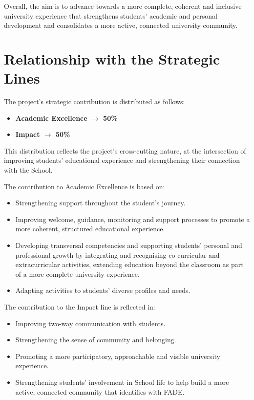 \documentclass[11pt,a4paper]{scrreprt}
\begin{document}
Overall, the aim is to advance towards a more complete, coherent and inclusive university experience that strengthens students' academic and personal development and consolidates a more active, connected university community.

\section{Relationship with the Strategic Lines}

\small
The project's strategic contribution is distributed as follows:

\begin{itemize}[noitemsep,topsep=2pt]
\item \textbf{Academic Excellence $\rightarrow$ 50\%}
\item \textbf{Impact $\rightarrow$ 50\%}
\end{itemize}
This distribution reflects the project's cross-cutting nature, at the intersection of improving students' educational experience and strengthening their connection with the School.

The contribution to Academic Excellence is based on:
\begin{itemize}[noitemsep,topsep=2pt]
\item Strengthening support throughout the student's journey.
\item Improving welcome, guidance, monitoring and support processes to promote a more coherent, structured educational experience.
\item Developing transversal competencies and supporting students' personal and professional growth by integrating and recognising co-curricular and extracurricular activities, extending education beyond the classroom as part of a more complete university experience.
\item Adapting activities to students' diverse profiles and needs.
\end{itemize}

The contribution to the Impact line is reflected in:
\begin{itemize}[noitemsep,topsep=2pt]
\item Improving two-way communication with students.
\item Strengthening the sense of community and belonging.
\item Promoting a more participatory, approachable and visible university experience.
\item Strengthening students' involvement in School life to help build a more active, connected community that identifies with FADE.
\end{itemize}
\end{document}
